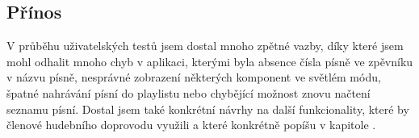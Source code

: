 \subsection{Přínos}

V průběhu uživatelských testů jsem dostal mnoho zpětné vazby, díky které jsem mohl odhalit mnoho chyb v aplikaci, kterými byla absence čísla písně ve zpěvníku v názvu písně, nesprávné zobrazení některých komponent ve světlém módu, špatné nahrávání písní do playlistu nebo chybějící možnost znovu načtení seznamu písní. Dostal jsem také konkrétní návrhy na další funkcionality, které by členové hudebního doprovodu využili a které konkrétně popíšu v kapitole .
